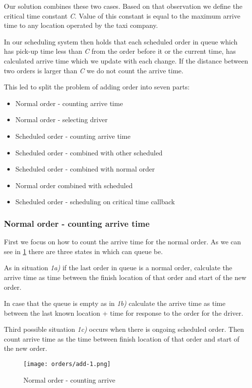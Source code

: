 Our solution combines these two cases. Based on that observation we define the critical time constant \textit{C}. Value of this constant is equal to the maximum arrive time to any location operated by the taxi company. 

In our scheduling system then holds that each scheduled order in queue which has pick-up time less than \textit{C} from the order before it or the current time, has calculated arrive time which we update with each change. If the distance between two orders is larger than \textit{C} we do not count the arrive time.

This led to split the problem of adding order into seven parts:
\begin{itemize}
	\item Normal order - counting arrive time
	\item Normal order - selecting driver
	\item Scheduled order - counting arrive time
	\item Scheduled order - combined with other scheduled
	\item Scheduled order - combined with normal order
	\item Normal order combined with scheduled
	\item Scheduled order - scheduling on critical time callback 
\end{itemize}

	\subsubsection{Normal order - counting arrive time}
	
	First we focus on how to count the arrive time for the normal order. As we can see in \ref{order-process-normal-order-counting-arrive} there are three states in which can queue be.
	
	As in situation \textit{1a)} if the last order in queue is a normal order, calculate the arrive time as time between the finish location of that order and start of the new order.
	
	In case that the queue is empty as in \textit{1b)} calculate the arrive time as time between the last known location + time for response to the order for the driver.
	
	Third possible situation \textit{1c)} occurs when there is ongoing scheduled order. Then count arrive time as the time between finish location of that order and start of the new order.
	
	
		\begin{figure}[h]\centering
			\texttt{[image: orders/add-1.png]}
			\caption{Normal order - counting arrive} 
			\label{order-process-normal-order-counting-arrive}
		\end{figure} 
	
